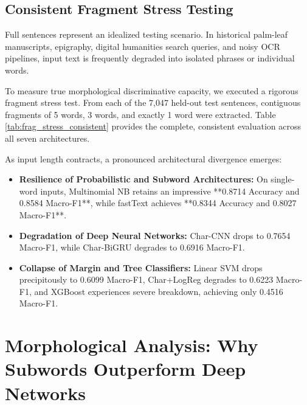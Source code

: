 \documentclass[11pt]{article}
\begin{document}
\subsection{Consistent Fragment Stress Testing}
Full sentences represent an idealized testing scenario. In historical palm-leaf manuscripts, epigraphy, digital humanities search queries, and noisy OCR pipelines, input text is frequently degraded into isolated phrases or individual words.

To measure true morphological discriminative capacity, we executed a rigorous fragment stress test. From each of the 7,047 held-out test sentences, contiguous fragments of 5 words, 3 words, and exactly 1 word were extracted. Table \ref{tab:frag_stress_consistent} provides the complete, consistent evaluation across all seven architectures.

As input length contracts, a pronounced architectural divergence emerges:
\begin{itemize}
    \item \textbf{Resilience of Probabilistic and Subword Architectures:} On single-word inputs, Multinomial NB retains an impressive **0.8714 Accuracy and 0.8584 Macro-F1**, while fastText achieves **0.8344 Accuracy and 0.8027 Macro-F1**.
    \item \textbf{Degradation of Deep Neural Networks:} Char-CNN drops to 0.7654 Macro-F1, while Char-BiGRU degrades to 0.6916 Macro-F1.
    \item \textbf{Collapse of Margin and Tree Classifiers:} Linear SVM drops precipitously to 0.6099 Macro-F1, Char+LogReg degrades to 0.6223 Macro-F1, and XGBoost experiences severe breakdown, achieving only 0.4516 Macro-F1.
\end{itemize}

\section{Morphological Analysis: Why Subwords Outperform Deep Networks}
\end{document}
